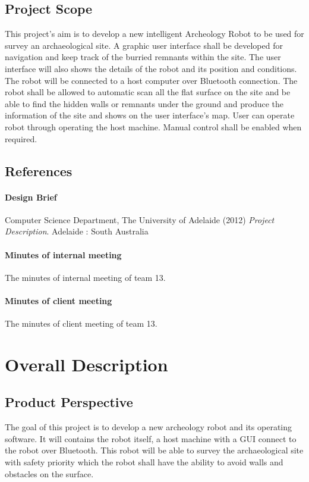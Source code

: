 \documentclass[11pt, a4paper]{report}
\begin{document}
\section{Project Scope}
This project's aim is to develop a new intelligent Archeology Robot to be used for survey an archaeological site. A graphic user interface shall be developed for navigation and keep track of the burried remnants within the site. The user interface will also shows the details of the robot and its position and conditions. The robot will be connected to a host computer over Bluetooth connection. The robot shall be allowed to automatic scan all the flat surface on the site and be able to find the hidden walls or remnants under the ground and produce the information of the site and shows on the user interface's map. 
User can operate robot through operating the host machine. Manual control shall be enabled when required.


\section{References}
\subsubsection*{Design Brief}
Computer Science Department, The University of Adelaide (2012) \textit{Project Description}. Adelaide : South Australia

\subsubsection*{Minutes of internal meeting}
The minutes of internal meeting of team 13.

\subsubsection*{Minutes of client meeting}
The minutes of client meeting of team 13.

\pagebreak



\chapter{Overall Description}

\section{Product Perspective}
The goal of this project is to develop a new archeology robot and its operating software. It will contains the robot itself, a host machine with a GUI connect to the robot over Bluetooth. This robot will be able to survey the archaeological site with safety priority which the robot shall have the ability to avoid walls and obstacles on the surface. 
\end{document}
